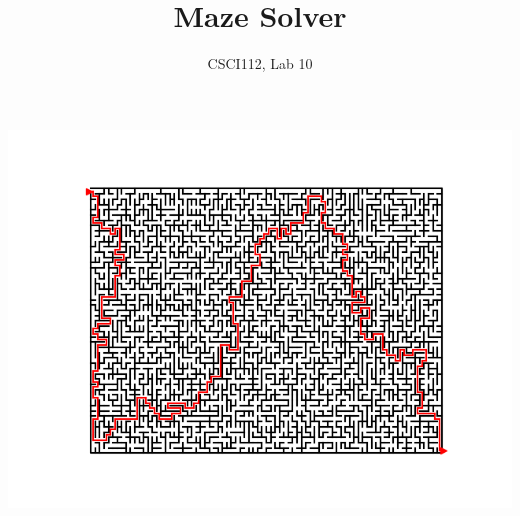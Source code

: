 \documentclass{article}
\title{Maze Solver}
\author{CSCI112, Lab 10}
\begin{document}
\maketitle
\centerline{\includegraphics[scale=1]{Figure_1}}
\end{document}
